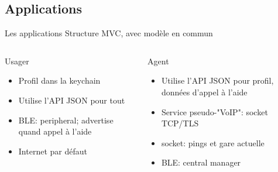 \documentclass{beamer}
\begin{document}
\subsection{Applications}
\begin{frame}{Les applications}
    Structure MVC, avec modèle en commun
    \begin{columns}
        \begin{column}{0.5\textwidth}
            \begin{block}{Usager}
                \begin{itemize}
                    \item Profil dans la keychain
                    \item Utilise l'API JSON pour tout
                    \item BLE: peripheral; advertise quand appel à l'aide
                    \item Internet par défaut
                \end{itemize}
            \end{block}
        \end{column}
        \begin{column}{0.5\textwidth}
            \begin{block}{Agent}
                \begin{itemize}
                    \item Utilise l'API JSON pour profil, données d'appel à l'aide
                    \item Service pseudo-"VoIP": socket TCP/TLS
                    \item socket: pings et gare actuelle
                    \item BLE: central manager
                \end{itemize}
            \end{block}
        \end{column}
    \end{columns}
\end{frame}
\end{document}
